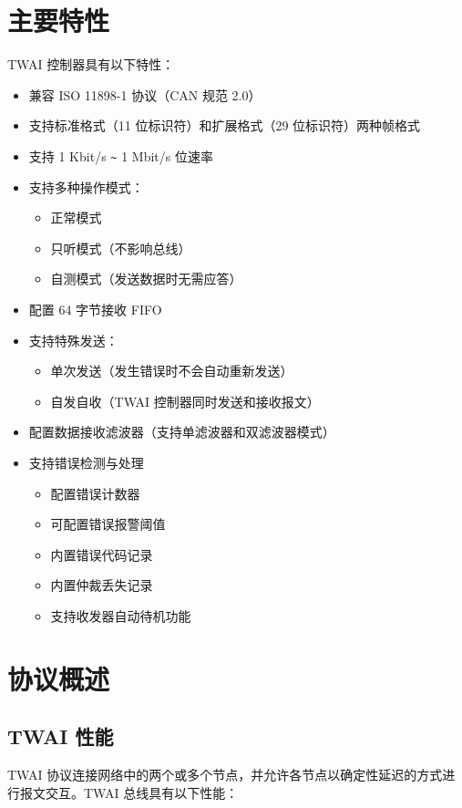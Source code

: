 \documentclass[main\_\_CN.tex]{subfiles}
\begin{document}
\section{主要特性}
\chipname{} TWAI 控制器具有以下特性：
\begin{itemize}
    \item 兼容 ISO 11898-1 协议（CAN 规范 2.0）
    \item 支持标准格式（11 位标识符）和扩展格式（29 位标识符）两种帧格式
    \item 支持 1 Kbit/s \verb+~+ 1 Mbit/s 位速率
    \item 支持多种操作模式：
    \begin{itemize}
        \item 正常模式
        \item 只听模式（不影响总线）
        \item 自测模式（发送数据时无需应答）
    \end{itemize}
    \item 配置 64 字节接收 FIFO
    \item 支持特殊发送：
    \begin{itemize}
        \item 单次发送（发生错误时不会自动重新发送）
        \item 自发自收（TWAI 控制器同时发送和接收报文）
    \end{itemize}
    \item 配置数据接收滤波器（支持单滤波器和双滤波器模式）
    \item 支持错误检测与处理  
    \begin{itemize}
        \item 配置错误计数器
        \item 可配置错误报警阈值
        \item 内置错误代码记录
        \item 内置仲裁丢失记录
    \end{itemize}
    \begin{itemize}
        \item 支持收发器自动待机功能
    \end{itemize}
\end{itemize}

\section{协议概述}
\label{sec:twai-functional-protocol}
\subsection{TWAI 性能}
TWAI 协议连接网络中的两个或多个节点，并允许各节点以确定性延迟的方式进行报文交互。TWAI 总线具有以下性能：
\end{document}
